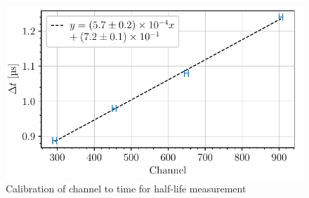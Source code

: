 \begin{figure}[htbp]
    \centering
    \includegraphics[scale=1]{figures/calibration_time_interval.pdf}    
    \caption{Calibration of channel to time for half-life measurement}
    \label{fig:calibration_halflife}
\end{figure}